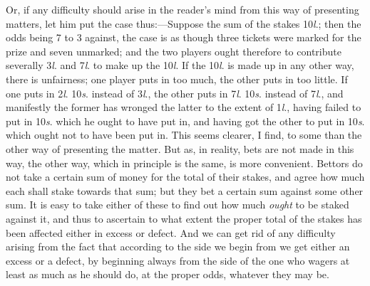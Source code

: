 \documentclass[letterpaper,12pt,oneside,openany]{memoir}
\begin{document}
Or, if any difficulty should arise in the reader's
mind from this way of presenting matters, let him put
the case thus:---Suppose the sum of the stakes 10\textit{l}.;
then the odds being 7 to 3 against, the case is as though
three tickets were marked for the prize and seven unmarked;
and the two players ought therefore to contribute
severally 3\textit{l}. and 7\textit{l}. to make up the 10\textit{l}. If the
10\textit{l}. is made up in any other way, there is unfairness;
one player puts in too much, the other puts in too
little. If one puts in 2\textit{l}. 10\textit{s}. instead of 3\textit{l}., the other
puts in 7\textit{l}. 10\textit{s}. instead of 7\textit{l}., and manifestly the former
has wronged the latter to the extent of 1\textit{l}., having
failed to put in 10\textit{s}. which he ought to have put in,
and having got the other to put in 10\textit{s}. which ought
not to have been put in. This seems clearer, I find, to
some than the other way of presenting the matter.
But as, in reality, bets are not made in this way, the
other way, which in principle is the same, is more convenient.
Bettors do not take a certain sum of money
for the total of their stakes, and agree how much each
shall stake towards that sum; but they bet a certain
sum against some other sum. It is easy to take either
of these to find out how much \textit{ought} to be staked against
it, and thus to ascertain to what extent the proper total
of the stakes has been affected either in excess or defect.
And we can get rid of any difficulty arising from the
fact that according to the side we begin from we get
either an excess or a defect, by beginning always from
the side of the one who wagers at least as much as he
should do, at the proper odds, whatever they may be.
\end{document}
